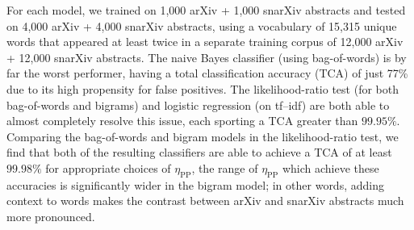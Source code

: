\documentclass[paperwidth=40in,paperheight=32in,margin=1in,fontscale=0.33]{baposter}
\begin{document}
\begin{poster}
{For each model, we trained on 1,000 arXiv + 1,000 snarXiv abstracts and tested on 4,000 arXiv + 4,000 snarXiv abstracts, using a vocabulary of 15,315 unique words that appeared at least twice in a separate training corpus of 12,000 arXiv + 12,000 snarXiv abstracts.
The naive Bayes classifier (using bag-of-words) is by far the worst performer, having a total classification accuracy (TCA) of just 77\% due to its high propensity for false positives.
The likelihood-ratio test (for both bag-of-words and bigrams) and logistic regression (on tf--idf) are both able to almost completely resolve this issue, each sporting a TCA greater than $99.95\%$.
Comparing the bag-of-words and bigram models in the likelihood-ratio test, we find that both of the resulting classifiers are able to achieve a TCA of at least $99.98\%$ for appropriate choices of $\eta_\text{PP}$, the range of $\eta_\text{PP}$ which achieve these accuracies is significantly wider in the bigram model; in other words, adding context to words makes the contrast between arXiv and snarXiv abstracts much more pronounced.
}
\setlength{\fboxsep}{1mm}








\end{poster}
\end{document}

